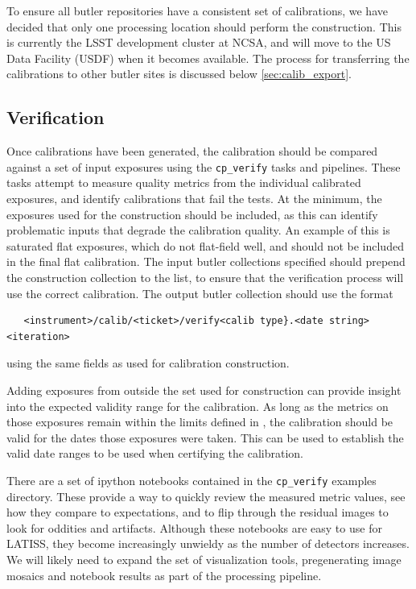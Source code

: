\documentclass[DM,authoryear,toc]{lsstdoc}
\begin{document}
To ensure all butler repositories have a consistent set of calibrations, we have decided that only one processing location should perform the construction.  This is currently the LSST development cluster at NCSA, and will move to the US Data Facility (USDF) when it becomes available.  The process for transferring the calibrations to other butler sites is discussed below \ref{sec:calib_export}.

\subsection{Verification}

Once calibrations have been generated, the calibration should be compared against a set of input exposures using the \verb|cp_verify| tasks and pipelines.  These tasks attempt to measure quality metrics from the individual calibrated exposures, and identify calibrations that fail the tests.  At the minimum, the exposures used for the construction should be included, as this can identify problematic inputs that degrade the calibration quality.  An example of this is saturated flat exposures, which do not flat-field well, and should not be included in the final flat calibration.  The input butler collections specified should prepend the construction collection to the list, to ensure that the verification process will use the correct calibration.  The output butler collection should use the format
\begin{verbatim}
   <instrument>/calib/<ticket>/verify<calib type}.<date string><iteration>
\end{verbatim}
\noindent using the same fields as used for calibration construction.

Adding exposures from outside the set used for construction can provide insight into the expected validity range for the calibration.  As long as the metrics on those exposures remain within the limits defined in ,  the calibration should be valid for the dates those exposures were taken.  This can be used to establish the valid date ranges to be used when certifying the calibration.

There are a set of ipython notebooks contained in the \verb|cp_verify| examples directory.  These provide a way to quickly review the measured metric values, see how they compare to expectations, and to flip through the residual images to look for oddities and artifacts.  Although these notebooks are easy to use for LATISS, they become increasingly unwieldy as the number of detectors increases.  We will likely need to expand the set of visualization tools, pregenerating image mosaics and notebook results as part of the processing pipeline.
\end{document}
